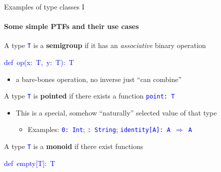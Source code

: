 \documentclass[english]{beamer}
\newenvironment{lyxcode}
   {\par\begin{list}{}{
     \setlength{\rightmargin}{\leftmargin}
     \setlength{\listparindent}{0pt}%
     \raggedright
     \setlength{\itemsep}{0pt}
     \setlength{\parsep}{0pt}
     \normalfont\ttfamily}%
    \def\{{\char`\{}
    \def\}{\char`\}}
    \def\textasciitilde{\char`\~}
    \item[]}
   {\end{list}}
\begin{document}
\begin{frame}{Examples of type classes I}


\framesubtitle{Some simple PTFs and their use cases}
\begin{itemize}
\item A type \texttt{\textcolor{blue}{\footnotesize{}T}} is a \textbf{semigroup}
if it has an \emph{associative} binary operation
\begin{lyxcode}
\textcolor{blue}{\footnotesize{}def~op(x:~T,~y:~T):~T}{\footnotesize \par}
\end{lyxcode}
\begin{itemize}
\item a bare-bones operation, no inverse \textendash{} just ``can combine'' 
\end{itemize}
\item A type \texttt{\textcolor{blue}{\footnotesize{}T}} is \textbf{pointed}
if there exists a function \texttt{\textcolor{blue}{\footnotesize{}point:\ T}}{\footnotesize \par}
\begin{itemize}
\item This is a special, somehow ``naturally'' selected value of that
type
\begin{itemize}
\item Examples: \texttt{\textcolor{blue}{\footnotesize{}0:\ Int}}; \texttt{\textcolor{blue}{\footnotesize{}\textquotedbl{}\textquotedbl{}:\ String}};
\texttt{\textcolor{blue}{\footnotesize{}identity{[}A{]}:\ A $\Rightarrow$
A}}{\footnotesize \par}
\end{itemize}
\end{itemize}
\item A type \texttt{\textcolor{blue}{\footnotesize{}T}} is a \textbf{monoid}
if there exist functions
\begin{lyxcode}
\textcolor{blue}{\footnotesize{}def~empty{[}T{]}:~T}{\footnotesize \par}


\end{lyxcode}
\end{itemize}
\end{frame}
\end{document}
